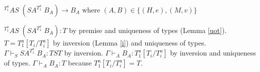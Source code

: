 \begin{case}
$^{T_{1}^{a}}AS\;(SA^{T_{1}^{a}}\;B_{A})\rightarrow B_{A}$ where $(A,B)\in\lbrace(H,e),(M,v)\rbrace$

$^{T_{1}^{a}}AS\;(SA^{T_{1}^{a}}\;B_{A}):T$ by premise and uniqueness of types (Lemma \ref{uot}).  $T=T_{1}^{a}[T_{i}/T_{i}^{a}]$ by inversion (Lemma \ref{i}) and uniqueness of types.  $\Gamma\vdash_{S}SA^{T_{1}^{a}}\;B_{A}:TST$ by inversion.  $\Gamma\vdash_{A}B_{A}:T_{1}^{a}[T_{i}/T_{i}^{a}]$ by inversion and uniqueness of types.  $\Gamma\vdash_{A}B_{A}:T$ because $T_{1}^{a}[T_{i}/T_{i}^{a}]=T$.
\end{case}